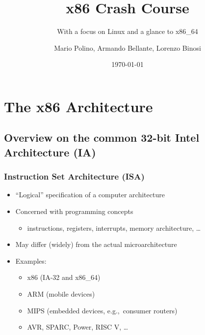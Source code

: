 \documentclass[]{beamer}
\title{x86 Crash Course}
\subtitle{With a focus on Linux and a glance to x86\_64}
\author[NECSTLab]{Mario Polino, Armando Bellante, Lorenzo Binosi}
\institute{DEIB, Politecnico di Milano}
\date{\today}
\begin{document}
\begin{frame}
	\titlepage
\end{frame}




\section{The x86 Architecture}
\subsection{Overview on the common 32-bit Intel Architecture (IA)}

\begin{frame}
	\frametitle{Instruction Set Architecture (ISA)}
	\begin{itemize}
	\item ``Logical'' specification of a computer architecture
	\item Concerned with programming concepts
	\begin{itemize}
		\item instructions, registers, interrupts, memory architecture, \dots
	\end{itemize}
	\item May differ (widely) from the actual microarchitecture
	\item Examples:
		\begin{itemize}
			\item x86 (IA-32 and x86\_64)
			\item ARM (mobile devices)
			\item MIPS (embedded devices, e.g.,~consumer routers)
			\item AVR, SPARC, Power, RISC V, \dots
		\end{itemize}
	\end{itemize}
\end{frame}
\end{document}
